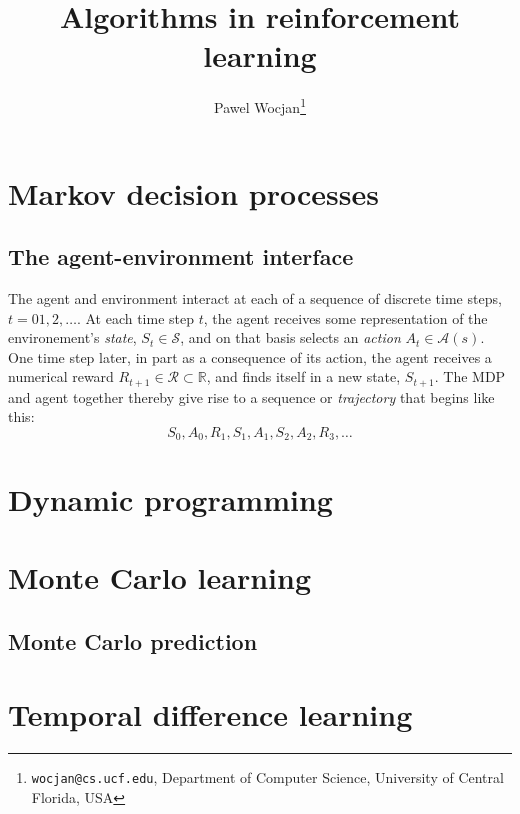 \documentclass[12pt]{article}
\newcommand{\<}{\langle}
\renewcommand{\>}{\rangle}
\renewcommand{\S}{\mathcal{S}}
\newcommand{\A}{\mathcal{A}}
\newcommand{\cR}{\mathcal{R}}
\begin{document}
\title{Algorithms in reinforcement learning}

\author{Pawel Wocjan\thanks{\texttt{wocjan@cs.ucf.edu}, Department of Computer Science, University of Central Florida, USA}}

\maketitle


%
%
%

\section{Markov decision processes}

\subsection{The agent-environment interface}

The agent and environment interact at each of a sequence of discrete time steps, $t=01,2,\ldots$. At each time step $t$, the agent receives some representation of the environement's 
\emph{state}, $S_t\in\S$, and on that basis selects an \emph{action} $A_t\in\A(s)$. One time step later, in part as a consequence of its action, the agent receives a numerical reward $R_{t+1}\in\cR\subset \mathbb{R}$, and finds itself in a new state, $S_{t+1}$. The MDP and agent together thereby give rise to a sequence or \emph{trajectory} that begins like this:
\[
S_0,A_0,R_1,S_1,A_1,S_2,A_2,R_3,\ldots
\]

%
%
%

\section{Dynamic programming}

\section{Monte Carlo learning}

\subsection{Monte Carlo prediction}

\section{Temporal difference learning}
\end{document}
